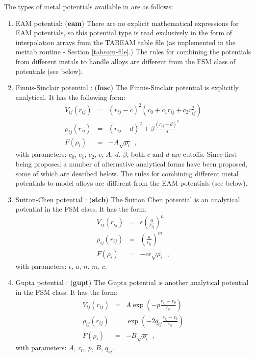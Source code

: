 The types of metal potentials available in \D{} are as follows:
\begin{enumerate}
\item EAM potential:  ({\bf eam})
There 
are no explicit mathematical expressions for EAM potentials, so
this potential type is read exclusively in the form of interpolation
arrays from the TABEAM table file (as implemented in the {\sc
mettab} routine - Section \ref{tabeam-file}.)  The rules
for combining the potentials from different metals to handle alloys
are different from the FSM class of potentials (see below).
\item Finnis-Sinclair potential \cite{finnis-84a}:  ({\bf fnsc})
The Finnis-Sinclair 
potential is explicitly analytical.  It has the 
following form:
\begin{eqnarray}
V_{ij}(r_{ij}) &=& (r_{ij}-c)^{2} (c_{0}+c_{1}r_{ij}+c_{2}r_{ij}^{2}) \nonumber \\
\rho_{ij}(r_{ij}) &=& (r_{ij}-d)^{2} + \beta \frac{(r_{ij}-d)^{3}}{d} \\
F(\rho_{i}) &=& -A \sqrt{\rho_{i}}~~, \nonumber
\end{eqnarray}
with parameters: $c_{0}$, $c_{1}$, $c_{2}$, $c$, $A$, $d$, $\beta$,
both $c$ and $d$ are cutoffs.  Since first being proposed a number of
alternative analytical forms have been proposed, some of which are
descibed below.  The rules for combining different metal potentials to
model alloys are different from the EAM potentials (see below).
\item Sutton-Chen potential \cite{sutton-90a,rafii-tabar-91a,todd-93a}:
({\bf stch})
The Sutton Chen 
potential is an analytical potential in the FSM
class.  It has the form:
\begin{eqnarray}
V_{ij}(r_{ij}) &=& \epsilon \left( \frac{a}{r_{ij}} \right)^{n} \nonumber \\
\rho_{ij}(r_{ij}) &=& \left( \frac{a}{r_{ij}} \right)^{m} \\
F(\rho_{i}) &=& -c \epsilon \sqrt{\rho_{i}}~~, \nonumber
\end{eqnarray}
with parameters: $\epsilon$, $a$, $n$, $m$, $c$. 
\item Gupta potential \cite{cleri-93a}:  ({\bf gupt})
The Gupta potential 
is another analytical potential in the FSM
class.  It has the form:
\begin{eqnarray}
V_{ij}(r_{ij}) &=& A \exp \left(-p \frac{r_{ij}-r_{0}}{r_{0}}\right) \nonumber \\
\rho_{ij}(r_{ij}) &=& \exp \left(-2 q_{ij} \frac{r_{ij}-r_{0}}{r_{0}}\right) \\
F(\rho_{i}) &=& -B \sqrt{\rho_{i}}~~, \nonumber
\end{eqnarray}
with parameters: $A$, $r_{0}$, $p$, $B$, $q_{ij}$.
\end{enumerate}

